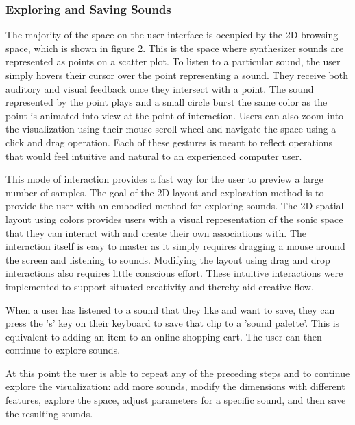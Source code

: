 \subsubsection{Exploring and Saving Sounds}
The majority of the space on the user interface is occupied by the 2D browsing space, which is shown in figure 2. This is the space where synthesizer sounds are represented as points on a scatter plot. To listen to a particular sound, the user simply hovers their cursor over the point representing a sound. They receive both auditory and visual feedback once they intersect with a point. The sound represented by the point plays and a small circle burst the same color as the point is animated into view at the point of interaction. Users can also zoom into the visualization using their mouse scroll wheel and navigate the space using a click and drag operation. Each of these gestures is meant to reflect operations that would feel intuitive and natural to an experienced computer user.

This mode of interaction provides a fast way for the user to preview a large number of samples. The goal of the 2D layout and exploration method is to provide the user with an embodied method for exploring sounds. The 2D spatial layout using colors provides users with a visual representation of the sonic space that they can interact with and create their own associations with. The interaction itself is easy to master as it simply requires dragging a mouse around the screen and listening to sounds. Modifying the layout using drag and drop interactions also requires little conscious effort. These intuitive interactions were implemented to support situated creativity and thereby aid creative flow.

When a user has listened to a sound that they like and want to save, they can press the 's' key on their keyboard to save that clip to a 'sound palette'. This is equivalent to adding an item to an online shopping cart. The user can then continue to explore sounds.

At this point the user is able to repeat any of the preceding steps and to continue explore the visualization: add more sounds, modify the dimensions with different features, explore the space, adjust parameters for a specific sound, and then save the resulting sounds.

